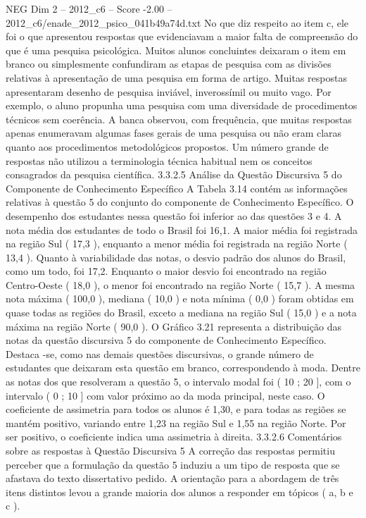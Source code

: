 \begin{textsample}{NEG Dim 2 – 2012\_c6 – Score -2.00 – 2012\_c6/enade\_2012\_psico\_041b49a74d.txt}
No que diz respeito ao item c, ele foi o que apresentou respostas que evidenciavam a maior falta de compreensão do que é uma pesquisa psicológica.
Muitos alunos concluintes deixaram o item em branco ou simplesmente confundiram as etapas de pesquisa com as divisões relativas à apresentação de uma pesquisa em forma de artigo.
Muitas respostas apresentaram desenho de pesquisa inviável, inverossímil ou muito vago.
Por exemplo, o aluno propunha uma pesquisa com uma diversidade de procedimentos técnicos sem coerência.
A banca observou, com frequência, que muitas respostas apenas enumeravam algumas fases gerais de uma pesquisa ou não eram claras quanto aos procedimentos metodológicos propostos.
Um número grande de respostas não utilizou a terminologia técnica habitual nem os conceitos consagrados da pesquisa científica. 3.3.2.5 Análise da Questão Discursiva 5 do Componente de Conhecimento Específico A Tabela 3.14 contém as informações relativas à questão 5 do conjunto do componente de Conhecimento Específico.
O desempenho dos estudantes nessa questão foi inferior ao das questões 3 e 4.
A nota média dos estudantes de todo o Brasil foi 16,1.
A maior média foi registrada na região Sul ( 17,3 ), enquanto a menor média foi registrada na região Norte ( 13,4 ).
Quanto à variabilidade das notas, o desvio padrão dos alunos do Brasil, como um todo, foi 17,2.
Enquanto o maior desvio foi encontrado na região Centro-Oeste ( 18,0 ), o menor foi encontrado na região Norte ( 15,7 ).
A mesma nota máxima ( 100,0 ), mediana ( 10,0 ) e nota mínima ( 0,0 ) foram obtidas em quase todas as regiões do Brasil, exceto a mediana na região Sul ( 15,0 ) e a nota máxima na região Norte ( 90,0 ).
O Gráfico 3.21 representa a distribuição das notas da questão discursiva 5 do componente de Conhecimento Específico.
Destaca -se, como nas demais questões discursivas, o grande número de estudantes que deixaram esta questão em branco, correspondendo à moda.
Dentre as notas dos que resolveram a questão 5, o intervalo modal foi ( 10 ; 20 ], com o intervalo ( 0 ; 10 ] com valor próximo ao da moda principal, neste caso.
O coeficiente de assimetria para todos os alunos é 1,30, e para todas as regiões se mantém positivo, variando entre 1,23 na região Sul e 1,55 na região Norte.
Por ser positivo, o coeficiente indica uma assimetria à direita. 3.3.2.6 Comentários sobre as respostas à Questão Discursiva 5 A correção das respostas permitiu perceber que a formulação da questão 5 induziu a um tipo de resposta que se afastava do texto dissertativo pedido.
A orientação para a abordagem de três itens distintos levou a grande maioria dos alunos a responder em tópicos ( a, b e c ).

\end{textsample}
